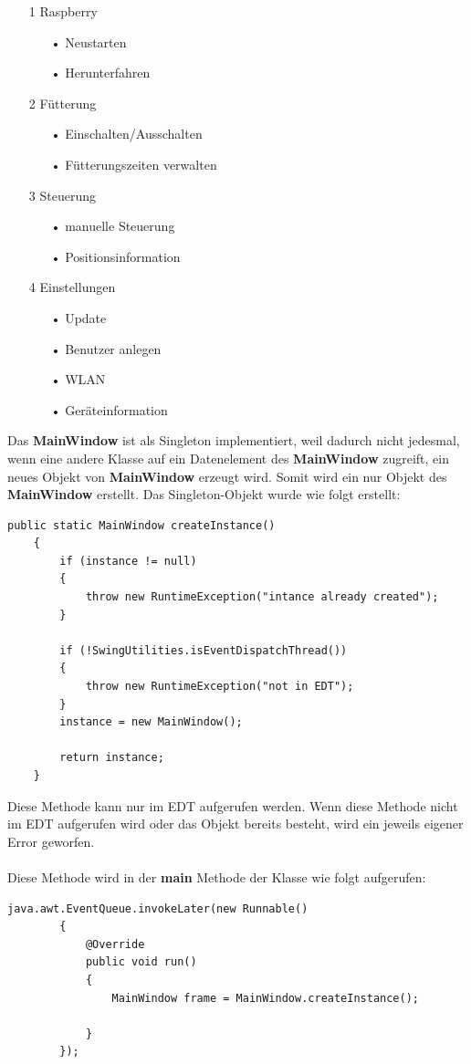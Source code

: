 \begin{itemize}
\item[1] Raspberry
\begin{itemize}
\item[•] Neustarten
\item[•] Herunterfahren
\end{itemize}
\item[2] Fütterung
\begin{itemize}
\item[•] Einschalten/Ausschalten
\item[•] Fütterungszeiten verwalten
\end{itemize}
\item[3] Steuerung
\begin{itemize}
\item[•] manuelle Steuerung
\item[•] Positionsinformation
\end{itemize}
\item[4] Einstellungen
\begin{itemize}
\item[•] Update
\item[•] Benutzer anlegen
\item[•] WLAN
\item[•] Geräteinformation
\end{itemize}
\end{itemize}

\vspace{10pt}

Das \textbf{MainWindow} ist als Singleton implementiert, weil dadurch nicht jedesmal, wenn eine andere Klasse auf ein Datenelement des \textbf{MainWindow} zugreift, ein neues Objekt von \textbf{MainWindow} erzeugt wird. Somit wird ein nur Objekt des \textbf{MainWindow} erstellt. Das Singleton-Objekt wurde wie folgt erstellt:
\begin{lstlisting}[style=JavaStyle, caption=MainWindow createInstance()]
public static MainWindow createInstance()
    {
        if (instance != null)
        {
            throw new RuntimeException("intance already created");
        }

        if (!SwingUtilities.isEventDispatchThread())
        {
            throw new RuntimeException("not in EDT");
        }
        instance = new MainWindow();

        return instance;
    }
\end{lstlisting}
Diese Methode kann nur im EDT aufgerufen werden. Wenn diese Methode nicht im EDT aufgerufen wird oder das Objekt bereits besteht, wird ein jeweils eigener Error geworfen.
\\ \\ Diese Methode wird in der \textbf{main} Methode der Klasse wie folgt aufgerufen:
\begin{lstlisting}[style=JavaStyle, caption=MainWindow createInstance() Aufruf]
	java.awt.EventQueue.invokeLater(new Runnable()
        {
            @Override
            public void run()
            {
                MainWindow frame = MainWindow.createInstance();

            }
        });
\end{lstlisting}

